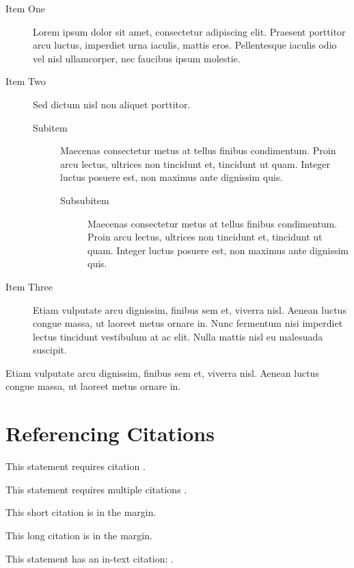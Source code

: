 \documentclass[
	a4paper, %
	12pt, %
]{CSSullivanBusinessReport}
\begin{document}
\begin{description}
	\item[Item One] Lorem ipsum dolor sit amet, consectetur adipiscing elit. Praesent porttitor arcu luctus, imperdiet urna iaculis, mattis eros. Pellentesque iaculis odio vel nisl ullamcorper, nec faucibus ipsum molestie.
	\item[Item Two] Sed dictum nisl non aliquet porttitor.
	\begin{description}
		\item[Subitem] Maecenas consectetur metus at tellus finibus condimentum. Proin arcu lectus, ultrices non tincidunt et, tincidunt ut quam. Integer luctus posuere est, non maximus ante dignissim quis.
		\begin{description}
			\item[Subsubitem] Maecenas consectetur metus at tellus finibus condimentum. Proin arcu lectus, ultrices non tincidunt et, tincidunt ut quam. Integer luctus posuere est, non maximus ante dignissim quis.
	\end{description}
	\end{description}
	\item[Item Three] Etiam vulputate arcu dignissim, finibus sem et, viverra nisl. Aenean luctus congue massa, ut laoreet metus ornare in. Nunc fermentum nisi imperdiet lectus tincidunt vestibulum at ac elit. Nulla mattis nisl eu malesuada suscipit.
\end{description}

Etiam vulputate arcu dignissim, finibus sem et, viverra nisl. Aenean luctus congue massa, ut laoreet metus ornare in.


\section{Referencing Citations}

This statement requires citation \autocite{Smith:2024jd}.

This statement requires multiple citations \autocite{Smith:2024jd, Smith:2023qr}.

This short citation is in the margin.

This long citation is in the margin.

This statement has an in-text citation: \textcite{Smith:2024jd}.
\end{document}
